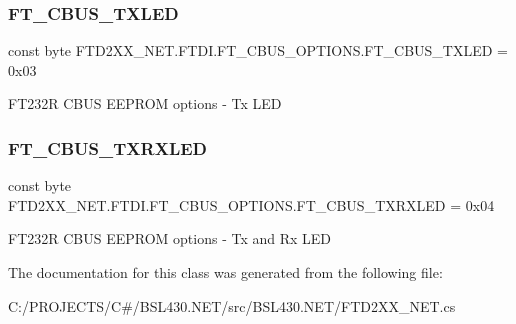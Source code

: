 \subsubsection{\texorpdfstring{FT\_CBUS\_TXLED}{FT\_CBUS\_TXLED}}
{\footnotesize\ttfamily const byte F\+T\+D2\+X\+X\+\_\+\+N\+E\+T.\+F\+T\+D\+I.\+F\+T\+\_\+\+C\+B\+U\+S\+\_\+\+O\+P\+T\+I\+O\+N\+S.\+F\+T\+\_\+\+C\+B\+U\+S\+\_\+\+T\+X\+L\+ED = 0x03}



F\+T232R C\+B\+US E\+E\+P\+R\+OM options -\/ Tx L\+ED 

\mbox{\label{class_f_t_d2_x_x___n_e_t_1_1_f_t_d_i_1_1_f_t___c_b_u_s___o_p_t_i_o_n_s_a778080a77e352b8e2cde686bfa1ab21d}} 
\subsubsection{\texorpdfstring{FT\_CBUS\_TXRXLED}{FT\_CBUS\_TXRXLED}}
{\footnotesize\ttfamily const byte F\+T\+D2\+X\+X\+\_\+\+N\+E\+T.\+F\+T\+D\+I.\+F\+T\+\_\+\+C\+B\+U\+S\+\_\+\+O\+P\+T\+I\+O\+N\+S.\+F\+T\+\_\+\+C\+B\+U\+S\+\_\+\+T\+X\+R\+X\+L\+ED = 0x04}



F\+T232R C\+B\+US E\+E\+P\+R\+OM options -\/ Tx and Rx L\+ED 



The documentation for this class was generated from the following file\+:\begin{DoxyCompactItemize}
\item 
C\+:/\+P\+R\+O\+J\+E\+C\+T\+S/\+C\#/\+B\+S\+L430.\+N\+E\+T/src/\+B\+S\+L430.\+N\+E\+T/F\+T\+D2\+X\+X\+\_\+\+N\+E\+T.\+cs\end{DoxyCompactItemize}
